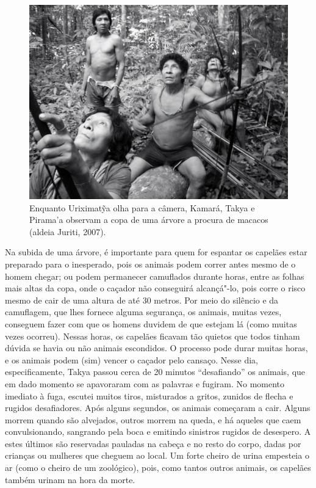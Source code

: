 \begin{figure}[!ht]
\centering
  \includegraphics[width=\textwidth]{./imgs/100_5208}
\caption{Enquanto Uriximatỹa olha para a câmera, Kamará, Takya e Pirama’a observam a copa de uma árvore a procura de macacos (aldeia Juriti, 2007).}
\end{figure}

Na subida de uma árvore, é importante para quem for espantar os capelães
estar preparado para o inesperado, pois os animais podem correr antes
mesmo de o homem chegar; ou podem permanecer camuflados durante horas,
entre as folhas mais altas da copa, onde o caçador não conseguirá
alcançá"-lo, pois corre o risco mesmo de cair de uma altura de até 30
metros. Por meio do silêncio e da camuflagem, que lhes fornece alguma
segurança, os animais, muitas vezes, conseguem fazer com que os homens
duvidem de que estejam lá (como muitas vezes ocorreu). Nessas horas, os
capelães ficavam tão quietos que todos tinham dúvida se havia ou não
animais escondidos. O processo pode durar muitas horas, e os animais
podem (sim) vencer o caçador pelo cansaço. Nesse dia, especificamente,
Takya passou cerca de 20 minutos ``desafiando'' os animais, que em dado
momento se apavoraram com as palavras e fugiram. No momento imediato à
fuga, escutei muitos tiros, misturados a gritos, zunidos de flecha e
rugidos desafiadores. Após alguns segundos, os animais começaram a cair.
Alguns morrem quando são alvejados, outros morrem na queda, e há aqueles
que caem convulsionando, sangrando pela boca e emitindo sinistros
rugidos de desespero. A estes últimos são reservadas pauladas na cabeça
e no resto do corpo, dadas por crianças ou mulheres que cheguem ao
local. Um forte cheiro de urina empesteia o ar (como o cheiro de um
zoológico), pois, como tantos outros animais, os capelães também urinam
na hora da morte.

